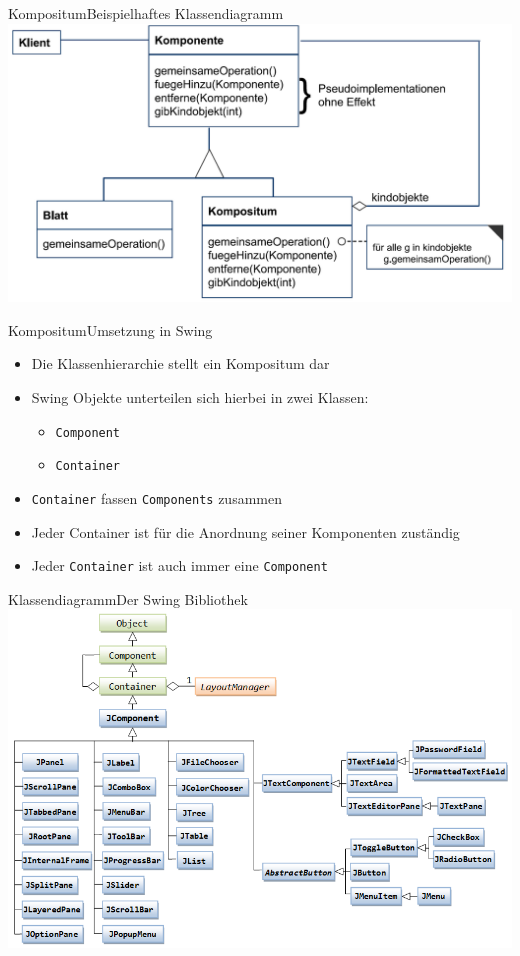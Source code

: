\begin{frame}{Kompositum}{Beispielhaftes Klassendiagramm}
	\includegraphics*[width=.8\textwidth]{graph/compositum_cd}
\end{frame}

\begin{frame}{Kompositum}{Umsetzung in Swing}
	\begin{itemize}
		\item Die Klassenhierarchie stellt ein Kompositum dar
		\item Swing Objekte unterteilen sich hierbei in zwei Klassen:
		\begin{itemize}
			\item \texttt{Component}
			\item \texttt{Container}
		\end{itemize}
		\item \texttt{Container} fassen \texttt{Components} zusammen
		\item Jeder Container ist für die Anordnung seiner Komponenten zuständig
		\item Jeder \texttt{Container} ist auch immer eine \texttt{Component}
	\end{itemize}
\end{frame}

\begin{frame}{Klassendiagramm}{Der Swing Bibliothek}
	\includegraphics*[width=.8\textwidth]{graph/swing_cd}
\end{frame}

